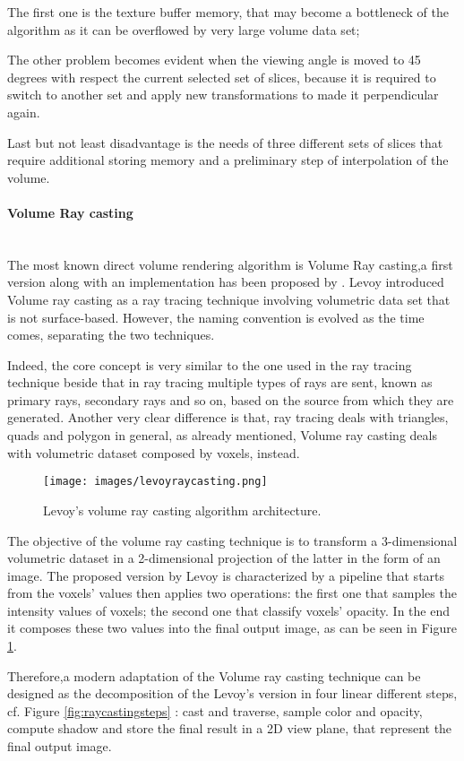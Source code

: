 \documentclass[12pt,a4paper]{extarticle}
\newcommand{\linespace}{\vspace{0pt}}
\newcommand{\myparagraph}[1]{\paragraph{#1}\mbox{}\\}
\begin{document}
The first one is the texture buffer memory, that may become a bottleneck of the algorithm as it can be overflowed by very large volume data set; 

The other problem becomes evident when the viewing angle is moved to 45 degrees with respect the current selected set of slices, because it is required to switch to another set and apply new transformations to made it perpendicular again.


Last but not least disadvantage is the needs of three different sets of slices that require additional storing memory and a preliminary step of interpolation of the volume.

\myparagraph{Volume Ray casting}
The most known direct volume rendering algorithm is Volume Ray casting,a first version along with an implementation has been proposed by \cite{levoy_1990:5}.
Levoy introduced Volume ray casting as a ray tracing technique involving volumetric data set that is not surface-based. However, the naming convention is evolved as the time comes, separating the two techniques.
\linespace

Indeed, the core concept is very similar to the one used in the ray tracing technique beside that in ray tracing multiple types of rays are sent, known as primary rays, secondary rays and so on, based on the source from which they are generated. Another very clear difference is that, ray tracing deals with triangles, quads and polygon in general, as already mentioned, Volume ray casting deals with volumetric dataset composed by voxels, instead.


\begin{figure}[hbtp]
\centering
\texttt{[image: images/levoyraycasting.png]}
\caption{Levoy's volume ray casting algorithm architecture.}
\label{fig:levoyraycasting}
\end{figure}

The objective of the volume ray casting technique is to transform a 3-dimensional volumetric dataset in a 2-dimensional projection of the latter in the form of an image. The proposed version by Levoy is characterized by a pipeline that starts from the voxels' values then applies two operations: the first one that samples the intensity values of voxels; the second one that classify voxels' opacity. In the end it composes these two values into the final output image, as can be seen in Figure \ref{fig:levoyraycasting}.
\linespace

Therefore,a modern adaptation of the Volume ray casting technique can be designed as the decomposition of the Levoy's version in four linear different steps, cf. Figure \ref{fig:raycastingsteps} %
: cast and traverse, sample color and opacity, compute shadow and store the final result in a 2D view plane, that represent the final output image.
\end{document}
